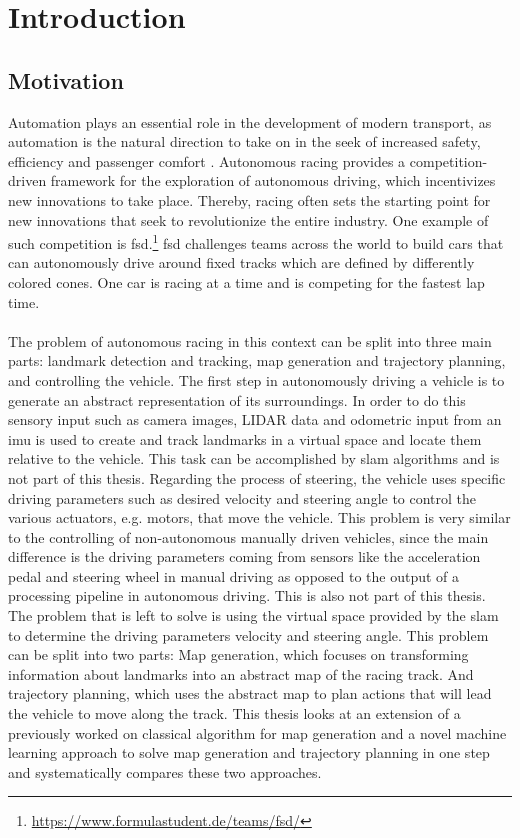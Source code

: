 \graphicspath{{Chapter/Figs/introduction/}}
\chapter{Introduction}

\section{Motivation}
Automation plays an essential role in the development of modern transport, as automation is the natural direction to take on in the seek of increased safety, efficiency and passenger comfort \cite{Lutin2018}. Autonomous racing provides a competition-driven framework for the exploration of autonomous driving, which incentivizes new innovations to take place. Thereby, racing often sets the starting point for new innovations that seek to revolutionize the entire industry\cite{Foxall91}. One example of such competition is \ac{fsd}.\footnote{\url{https://www.formulastudent.de/teams/fsd/}} \ac{fsd} challenges teams across the world to build cars that can autonomously drive around fixed tracks which are defined by differently colored cones. One car is racing at a time and is competing for the fastest lap time.\\
\\The problem of autonomous racing in this context can be split into three main parts: landmark detection and tracking, map generation and trajectory planning, and controlling the vehicle. The first step in autonomously driving a vehicle is to generate an abstract representation of its surroundings. In order to do this sensory input such as camera images, LIDAR data and odometric input from an \ac{imu} is used to create and track landmarks in a virtual space and locate them relative to the vehicle. This task can be accomplished by \ac{slam} algorithms \cite{Singandhupe2019} and is not part of this thesis. Regarding the process of steering, the vehicle uses specific driving parameters such as desired velocity and steering angle to control the various actuators, e.g. motors, that move the vehicle. This problem is very similar to the controlling of non-autonomous manually driven vehicles, since the main difference is the driving parameters coming from sensors like the acceleration pedal and steering wheel in manual driving as opposed to the output of a processing pipeline in autonomous driving. This is also not part of this thesis. The problem that is left to solve is using the virtual space provided by the \ac{slam} to determine the driving parameters velocity and steering angle. This problem can be split into two parts: Map generation, which focuses on transforming information about landmarks into an abstract map of the racing track. And trajectory planning, which uses the abstract map to plan actions that will lead the vehicle to move along the track. This thesis looks at an extension of a previously worked on classical algorithm for map generation and a novel machine learning approach to solve map generation and trajectory planning in one step and systematically compares these two approaches.\\
